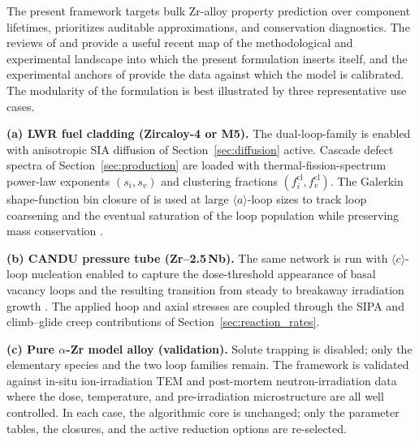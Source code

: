  The present framework
targets bulk Zr-alloy property prediction over component lifetimes,
prioritizes auditable approximations, and conservation diagnostics.  The reviews of
\cite{OnimusBechade2012} and \cite{Adamson2019} provide a useful
recent map of the methodological and experimental landscape into
which the present formulation inserts itself, and the experimental
anchors of \cite{Onimus2004,Yi2013,Doriot2015,Carpenter1988} provide
the data against which the model is calibrated. The modularity of the formulation is best illustrated by three
representative use cases.

\textbf{(a) LWR fuel cladding (Zircaloy-4 or M5).} The
dual-loop-family is
enabled with anisotropic SIA diffusion of Section~\ref{sec:diffusion}
active.  Cascade defect spectra of Section~\ref{sec:production} are
loaded with thermal-fission-spectrum power-law exponents
$(s_{i},s_{v})$ and clustering fractions
$(f_{i}^{\mathrm{cl}},f_{v}^{\mathrm{cl}})$.  The Galerkin
shape-function bin closure of is used
at large $\langle a\rangle$-loop sizes to track loop coarsening and
the eventual saturation of the loop population while preserving mass
conservation \citep{OnimusBechade2012,Doriot2015}.

\textbf{(b) CANDU pressure tube (Zr--2.5\,Nb).} The same network is
run with $\langle c\rangle$-loop nucleation enabled to capture the dose-threshold appearance of basal vacancy
loops and the resulting transition from steady to breakaway
irradiation growth \citep{Holt1988,HoltCausey1993}.  The applied
hoop and axial stresses are coupled through the SIPA and
climb--glide creep contributions of Section~\ref{sec:reaction_rates}.

\textbf{(c) Pure $\alpha$-Zr model alloy (validation).}  Solute
trapping is disabled; only the elementary species and the two loop
families remain.  The framework is validated against in-situ
ion-irradiation TEM \citep{Yi2013} and post-mortem
neutron-irradiation data \citep{Carpenter1988} where the dose,
temperature, and pre-irradiation microstructure are all well
controlled. In each case, the algorithmic core is unchanged; only the parameter
tables, the closures, and the active reduction options are
re-selected.


